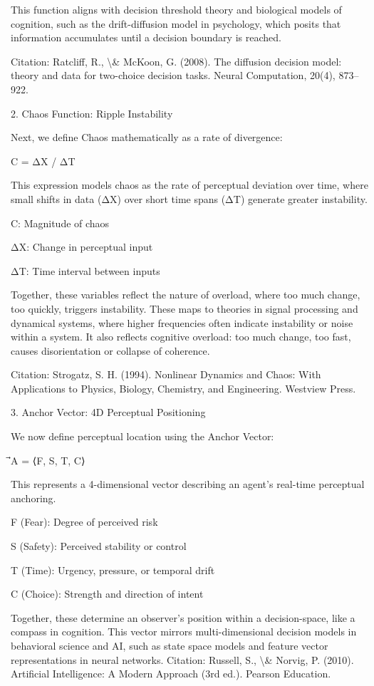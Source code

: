 \documentclass[12pt]{article}
\begin{document}
This function aligns with decision threshold theory and biological models of cognition, such as the drift-diffusion model in psychology, which posits that information accumulates until a decision boundary is reached.

Citation: Ratcliff, R., \textbackslash{}& McKoon, G. (2008). The diffusion decision model: theory and data for two-choice decision tasks. Neural Computation, 20(4), 873–922.

2. Chaos Function: Ripple Instability

Next, we define Chaos mathematically as a rate of divergence:

C = ΔX / ΔT

This expression models chaos as the rate of perceptual deviation over time, where small shifts in data (ΔX) over short time spans (ΔT) generate greater instability.

C: Magnitude of chaos

ΔX: Change in perceptual input

ΔT: Time interval between inputs

Together, these variables reflect the nature of overload, where too much change, too quickly, triggers instability. These maps to theories in signal processing and dynamical systems, where higher frequencies often indicate instability or noise within a system. It also reflects cognitive overload: too much change, too fast, causes disorientation or collapse of coherence.

Citation: Strogatz, S. H. (1994). Nonlinear Dynamics and Chaos: With Applications to Physics, Biology, Chemistry, and Engineering. Westview Press.

3. Anchor Vector: 4D Perceptual Positioning

We now define perceptual location using the Anchor Vector:

⃗A = ⟨F, S, T, C⟩

This represents a 4-dimensional vector describing an agent’s real-time perceptual anchoring.

F (Fear): Degree of perceived risk

S (Safety): Perceived stability or control

T (Time): Urgency, pressure, or temporal drift

C (Choice): Strength and direction of intent

Together, these determine an observer’s position within a decision-space, like a compass in cognition. This vector mirrors multi-dimensional decision models in behavioral science and AI, such as state space models and feature vector representations in neural networks. Citation: Russell, S., \textbackslash{}& Norvig, P. (2010). Artificial Intelligence: A Modern Approach (3rd ed.). Pearson Education.
\end{document}
